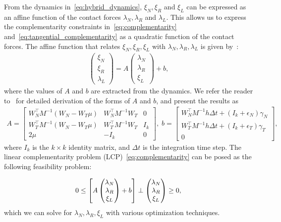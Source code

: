 From the dynamics in~\eqref{eq:hybrid_dynamics}, $\xi_N, \xi_R$ and $\xi_L$ can
be expressed as an affine function of the contact forces $\lambda_N, \lambda_R$
and $\lambda_L$.
%
This allows us to express the complementarity constraints
in~\eqref{eq:complementarity} and~\eqref{eq:tangential_complementarity} as a
quadratic function of the contact forces.
%
The affine function that relates $\xi_N, \xi_R, \xi_L$ with $\lambda_N,
\lambda_R, \lambda_L$ is given by~\cite{glocker2005formulation}: 
\begin{align*}
  \begin{pmatrix}
    \xi_N \\
    \xi_R \\
    \lambda_L
  \end{pmatrix} =
      A
    \begin{pmatrix}
      \lambda_N \\
      \lambda_R \\
      \xi_L
    \end{pmatrix} + b, 
\end{align*}
\noindent where the values of $A$ and $b$ are extracted from the dynamics. We
refer the reader to~\cite{glocker2005formulation} for detailed derivation of the
forms of $A$ and $b$, and present the results as
\begin{gather*}
    A = \begin{bmatrix}
      W_N^\top M^{-1} (W_N - W_T \mu) & W_N^\top M^{-1} W_T & 0  \\
      W_T^\top M^{-1} (W_N - W_T \mu) & W_T^\top M^{-1} W_T & I_k  \\
      2\mu & -I_k & 0
    \end{bmatrix}, \;  b = \begin{bmatrix}
      W_N^\top M^{-1} h \Delta t + (I_k+\epsilon_N) \gamma_N\\
      W_T^\top M^{-1} h \Delta t + (I_k+\epsilon_T) \gamma_T\\
      0
    \end{bmatrix}, 
\end{gather*}
\noindent where $I_k$ is the $k \times k$
identity matrix, and $\Delta t$ is the integration time step.
%
The linear complementarity problem (LCP)~\eqref{eq:complementarity} can be posed as
the following feasibility problem:

\begin{equation}
    0 \leq 
    \left[ A \begin{pmatrix}
      \lambda_N \\
      \lambda_R \\
      \xi_L
    \end{pmatrix} + b \right]
    \perp
    \begin{pmatrix}
      \lambda_N \\
      \lambda_R \\
      \xi_L
    \end{pmatrix} \geq 0, \\
  \label{eq:feasibility} 
\end{equation}
\noindent which we can solve for $\lambda_N, \lambda_R, \xi_L$ with various
optimization techniques. 

